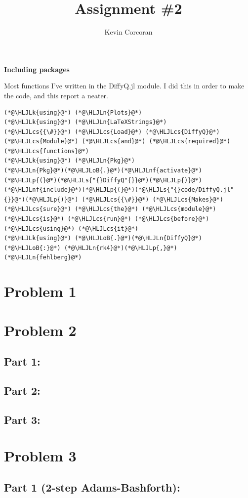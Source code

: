 \documentclass[12pt,a4paper]{article}
\title{ Assignment \#2 }
\author{ Kevin Corcoran }
\newcommand{\HLJLk}[1]{\textcolor[RGB]{148,91,176}{\textbf{#1}}}
\newcommand{\HLJLn}[1]{#1}
\newcommand{\HLJLnf}[1]{\textcolor[RGB]{66,102,213}{#1}}
\newcommand{\HLJLs}[1]{\textcolor[RGB]{201,61,57}{#1}}
\newcommand{\HLJLoB}[1]{\textcolor[RGB]{102,102,102}{\textbf{#1}}}
\newcommand{\HLJLp}[1]{#1}
\newcommand{\HLJLcs}[1]{\textcolor[RGB]{153,153,119}{\textit{#1}}}
\begin{document}
\maketitle

\textbf{Including packages}

Most functions I've written in the DiffyQ.jl module. I did this in order to make the code, and this report a neater. 


\begin{lstlisting}
(*@\HLJLk{using}@*) (*@\HLJLn{Plots}@*)
(*@\HLJLk{using}@*) (*@\HLJLn{LaTeXStrings}@*)
(*@\HLJLcs{{\#}}@*) (*@\HLJLcs{Load}@*) (*@\HLJLcs{DiffyQ}@*) (*@\HLJLcs{Module}@*) (*@\HLJLcs{and}@*) (*@\HLJLcs{required}@*) (*@\HLJLcs{functions}@*)
(*@\HLJLk{using}@*) (*@\HLJLn{Pkg}@*)
(*@\HLJLn{Pkg}@*)(*@\HLJLoB{.}@*)(*@\HLJLnf{activate}@*)(*@\HLJLp{(}@*)(*@\HLJLs{"{}DiffyQ"{}}@*)(*@\HLJLp{)}@*)
(*@\HLJLnf{include}@*)(*@\HLJLp{(}@*)(*@\HLJLs{"{}code/DiffyQ.jl"{}}@*)(*@\HLJLp{)}@*) (*@\HLJLcs{{\#}}@*) (*@\HLJLcs{Makes}@*) (*@\HLJLcs{sure}@*) (*@\HLJLcs{the}@*) (*@\HLJLcs{module}@*) (*@\HLJLcs{is}@*) (*@\HLJLcs{run}@*) (*@\HLJLcs{before}@*) (*@\HLJLcs{using}@*) (*@\HLJLcs{it}@*)
(*@\HLJLk{using}@*) (*@\HLJLoB{.}@*)(*@\HLJLn{DiffyQ}@*)(*@\HLJLoB{:}@*) (*@\HLJLn{rk4}@*)(*@\HLJLp{,}@*) (*@\HLJLn{fehlberg}@*)
\end{lstlisting}


\section{Problem 1}
\section{Problem 2}
\subsection{Part 1:}
\subsection{Part 2:}
\subsection{Part 3:}
\section{Problem 3}
\subsection{Part 1 (2-step Adams-Bashforth):}
\end{document}
